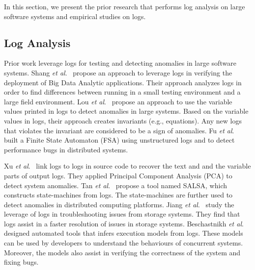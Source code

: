 In this section, we present the prior research that performs log analysis on large software systems and empirical studies on logs. 


\subsection{Log Analysis}

Prior work leverage logs for testing and detecting anomalies in large software systems. Shang\textsl{ et al$.$}~\cite{IanContextinformation} propose an approach to leverage logs in verifying the deployment of Big Data Analytic applications. Their approach analyzes logs in order to find differences between running in a small testing environment and a large field environment. Lou \textsl{et al}$.$~\cite{JGLouMining} propose an approach to use the variable values printed in logs to detect anomalies in large systems. Based on the variable values in logs, their approach creates invariants (e.g., equations). Any new logs that violates the invariant are considered to be a sign of anomalies. Fu \textsl{et al}$.$~\cite{QFuanomaly} built a Finite State Automaton (FSA) using unstructured logs and to detect performance bugs in distributed systems. 

Xu \textsl{et al$.$}~\cite{ConsoleLogs} link logs to logs in source code to recover the text and and the variable parts of output logs. They applied Principal Component Analysis (PCA) to detect system anomalies. Tan \textsl{et al}$.$~\cite{TanSalsa} propose a tool named SALSA, which constructs state-machines from logs. The state-machines are further used to detect anomalies in distributed computing platforms. Jiang \textsl{et al}$.$~\cite{Jiang:2009:UCP:1525908.1525912} study the leverage of logs in troubleshooting issues from storage systems. They find that logs assist in a faster resolution of issues in storage systems. Beschastnikh \textsl{et al}$.$~\cite{Beschastnikh:2011:LEI:2025113.2025151} designed automated tools that infers execution models from logs. These models can be used by developers to understand the behaviours of concurrent systems. Moreover, the models also assist in verifying the correctness of the system and fixing bugs.

